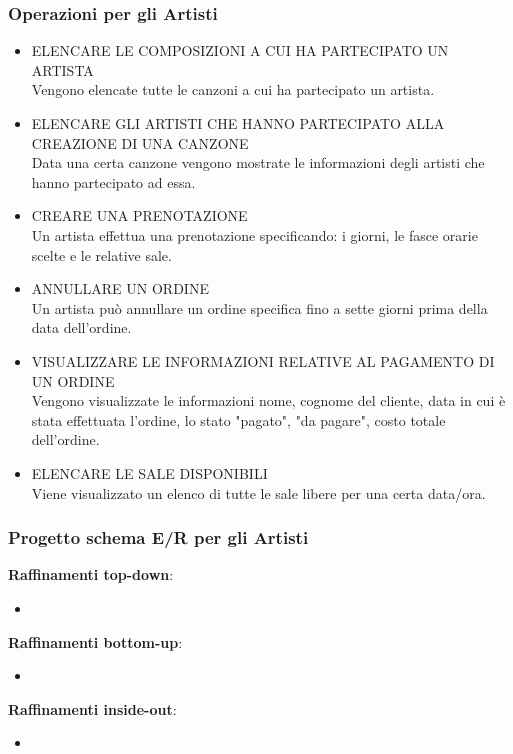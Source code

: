 \documentclass{article}
\newcounter{counteroperazioni}
\newcommand{\coperazioni}{\addtocounter{counteroperazioni}{1}\thecounteroperazioni}
\begin{document}
\subsubsection{Operazioni per gli Artisti}
\setcounter{counteroperazioni}{0}
\begin{itemize}[labelindent=1.5em,labelsep=.5cm,leftmargin=*]
    \item [\textbf{A\coperazioni)}] ELENCARE LE COMPOSIZIONI A CUI HA PARTECIPATO UN ARTISTA \\ Vengono elencate tutte le canzoni a cui ha partecipato un artista.
    \item [\textbf{A\coperazioni)}] ELENCARE GLI ARTISTI CHE HANNO PARTECIPATO ALLA CREAZIONE DI UNA CANZONE \\ Data una certa canzone vengono mostrate le informazioni degli artisti che hanno partecipato ad essa.

    \item [\textbf{A\coperazioni)}] CREARE UNA PRENOTAZIONE \\ Un artista effettua una prenotazione specificando: i giorni, le fasce orarie scelte e le relative sale. 
    \item [\textbf{A\coperazioni)}] ANNULLARE UN ORDINE \\ Un artista può annullare un ordine specifica fino a sette giorni prima della data dell'ordine.
    \item [\textbf{A\coperazioni)}] VISUALIZZARE LE INFORMAZIONI RELATIVE AL PAGAMENTO DI UN ORDINE \\ Vengono visualizzate le informazioni nome, cognome del cliente, data in cui è stata effettuata l'ordine, lo stato "pagato", "da pagare", costo totale dell'ordine. 
    \item [\textbf{A\coperazioni)}] ELENCARE LE SALE DISPONIBILI \\ Viene visualizzato un elenco di tutte le sale libere per una certa data/ora.
\end{itemize}



\subsubsection{Progetto schema E/R per gli Artisti}
\begin{center}
    
\end{center}
\textbf{Raffinamenti top-down}:
\begin{itemize}
    \item 
\end{itemize}
\textbf{Raffinamenti bottom-up}:
\begin{itemize}
    \item 
\end{itemize}
\textbf{Raffinamenti inside-out}:
\begin{itemize}
    \item 
\end{itemize}
\end{document}
